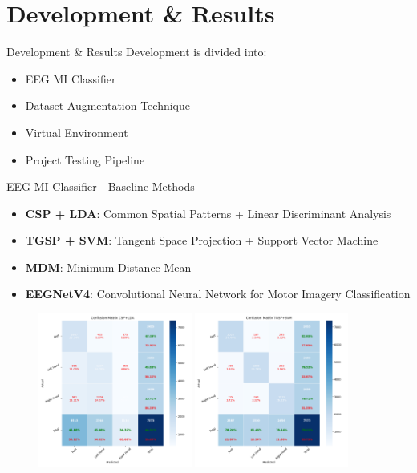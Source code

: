 \section{Development \& Results}
\begin{frame}{Development \& Results}
Development is divided into:
\begin{itemize}
    \item EEG MI Classifier
    \item Dataset Augmentation Technique
    \item Virtual Environment
    \item Project Testing Pipeline
\end{itemize}
\end{frame}

\begin{frame}{EEG MI Classifier - Baseline Methods}
    \begin{minipage}[c]{.65\textwidth}
        \begin{itemize}
            \item \textbf{CSP + LDA}: Common Spatial Patterns + Linear Discriminant Analysis
            \item \textbf{TGSP + SVM}: Tangent Space Projection + Support Vector Machine
            \item \textbf{MDM}: Minimum Distance Mean
            \item \textbf{EEGNetV4}: Convolutional Neural Network for Motor Imagery Classification
        \end{itemize}        
    \end{minipage}
    \begin{minipage}[c]{.33\textwidth}
        \begin{figure}[htpb!]
            \centering
            \includegraphics[width=0.45\textwidth]{figures/classification/confusion_matrix_csp_lda}
            \includegraphics[width=0.45\textwidth]{figures/classification/confusion_matrix_tgsp_svm}

\end{figure}
\end{minipage}
\end{frame}
